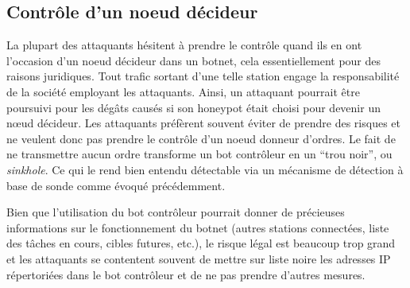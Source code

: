 \subsection{Contrôle d'un noeud décideur}

La plupart des attaquants hésitent à prendre le contrôle quand ils en ont
l'occasion d'un noeud décideur dans un botnet, cela essentiellement pour des
raisons juridiques.  Tout trafic sortant d'une telle station engage la
responsabilité de la société employant les attaquants.  Ainsi, un attaquant
pourrait être poursuivi pour les dégâts causés si son honeypot était choisi pour
devenir un nœud décideur.  Les attaquants préfèrent souvent éviter de prendre
des risques et ne veulent donc pas prendre le contrôle d'un noeud donneur
d'ordres. Le fait de ne transmettre aucun ordre transforme un bot contrôleur en
un ``trou noir'', ou \textit{sinkhole}.  Ce qui le rend bien entendu détectable
via un mécanisme de détection à base de sonde comme évoqué précédemment.  

Bien que l'utilisation du bot contrôleur pourrait donner de
précieuses informations sur le fonctionnement du botnet (autres stations
connectées, liste des tâches en cours, cibles futures, etc.), le risque légal
est beaucoup trop grand et les attaquants se contentent souvent de mettre
sur liste noire les adresses IP répertoriées dans le bot contrôleur et de ne pas
prendre d'autres mesures.
